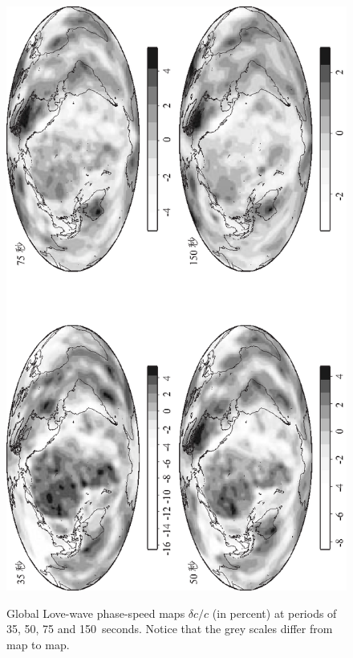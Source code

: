 \begin{figure}
\begin{center}
{
\includegraphics{../figures/chap16/fig19.eps}
}
\end{center}
\caption[phase_mapsL]{
Global Love-wave phase-speed maps $\delta c/c$
(in percent) at periods of 35, 50, 75 and 150~seconds.
Notice that the grey scales differ from map to map.
}
\label{fig:16.phase_mapsL}
\end{figure}
